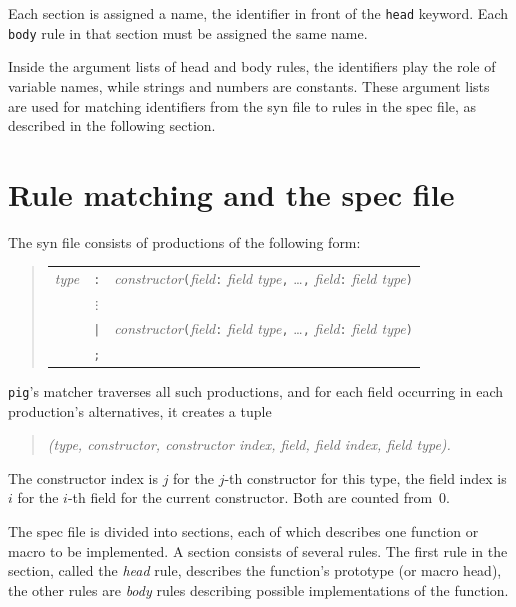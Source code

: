 \documentclass[a4paper,12pt]{article}
\def\pig{{\tt pig}}
\begin{document}
Each section is assigned a name, the identifier in front of the
\verb+head+ keyword. Each \verb+body+ rule in that section must be
assigned the same name.

Inside the argument lists of head and body rules, the identifiers
play the role of variable names, while strings and numbers are
constants. These argument lists are used for matching identifiers
from the syn file to rules in the spec file, as described in the
following section.

\section{Rule matching and the spec file}

The syn file consists of productions of the following form:

\begin{quote}
\begin{tabular}{r @{} c l}
{\em type} & {\tt:} & {\em constructor}{\verb+(+}{\em field}{\tt:}
        {\em field type}{\tt,} \ldots {\tt,}{ \em field}{\tt:}
        {\em field type}{\verb+)+} \\
 & \(\vdots\) & \\
 & {\tt|} & {\em constructor}{\verb+(+}{\em field}{\tt:}
        {\em field type}{\tt,} \ldots {\tt,}{ \em field}{\tt:}
        {\em field type}{\verb+)+} \\
 & {\tt;} & \\
\end{tabular}
\end{quote}

\pig's matcher traverses all such productions, and for each field
occurring in each production's alternatives, it creates a tuple
\begin{quote}
\em(type, constructor, constructor index, field, field index,
        field type).
\end{quote}

The constructor index is \(j\) for the \(j\)-th constructor for this
type, the field index is \(i\) for the \(i\)-th field for the
current constructor. Both are counted from~0.

The spec file is divided into sections, each of which describes one
function or macro to be implemented. A section consists of several
rules. The first rule in the section, called the {\em head} rule,
describes the function's prototype (or macro head), the other rules
are {\em body} rules describing possible implementations of the
function.
\end{document}
